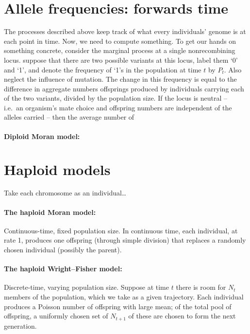 \section{Allele frequencies: forwards time}

The processes described above keep track of what every individuals' genome is at each point in time.
Now, we need to compute something.
To get our hands on something concrete, consider the marginal process at a single nonrecombining locus.
suppose that there are two possible variants at this locus,
label them `0' and `1',
and denote the frequency of `1's in the population at time $t$ by $P_t$.
Also neglect the influence of mutation.
The change in this frequency is equal to the difference in aggregate numbers offsprings produced by individuals 
carrying each of the two variants,
divided by the population size.
If the locus is neutral
-- i.e.\ an organism's mate choice and offspring numbers are independent of the alleles carried --
then the average number of 

\paragraph{Diploid Moran model:}


\section{Haploid models}

Take each chromosome as an individual\ldots

\paragraph{The haploid Moran model:}
Continuous-time, fixed population size.
In continuous time, each individual, at rate 1, 
produces one offspring (through simple division)
that replaces a randomly chosen individual (possibly the parent).

\paragraph{The haploid Wright--Fisher model:}
Discrete-time, varying population size.
Suppose at time $t$ there is room for $N_t$ members of the population,
which we take as a given trajectory.
Each individual produces a Poisson number of offspring with large mean;
of the total pool of offspring, a uniformly chosen set of $N_{t+1}$ of these
are chosen to form the next generation.




